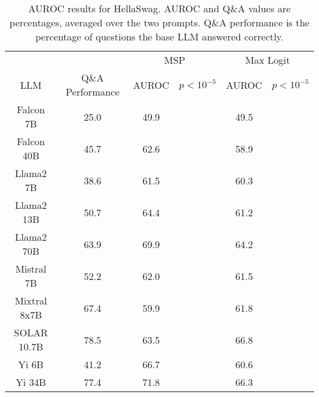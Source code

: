 \begin{table*}
\centering
\begin{tabular}{c|c|c|c|c|c}
& & \multicolumn{2}{c|}{MSP} & \multicolumn{2}{c}{Max Logit} \\ 
LLM & Q\&A Performance & AUROC & $p < 10^{-5}$ & AUROC & $p < 10^{-5}$\\ \hline
Falcon 7B & 25.0 & 49.9 &  & 49.5 & \\
Falcon 40B & 45.7 & 62.6 &  & 58.9 & \\
Llama2 7B & 38.6 & 61.5 &  & 60.3 & \\
Llama2 13B & 50.7 & 64.4 &  & 61.2 & \\
Llama2 70B & 63.9 & 69.9 &  & 64.2 & \\
Mistral 7B & 52.2 & 62.0 &  & 61.5 & \\
Mixtral 8x7B & 67.4 & 59.9 &  & 61.8 & \\
SOLAR 10.7B & 78.5 & 63.5 &  & 66.8 & \\
Yi 6B & 41.2 & 66.7 &  & 60.6 & \\
Yi 34B & 77.4 & 71.8 &  & 66.3 & \\
\hline
\end{tabular}
\caption{AUROC results for HellaSwag. AUROC and Q\&A values are percentages, averaged over the two prompts. Q\&A performance is the percentage of questions the base LLM answered correctly.}
\label{tab:hellaswag_auroc}
\end{table*}
